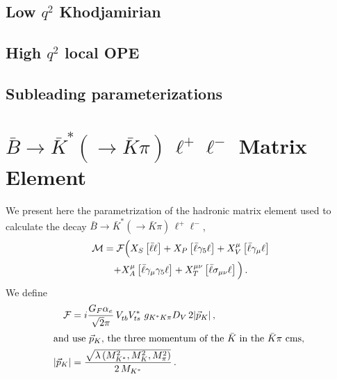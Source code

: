 %
\subsection{\boldmath Low $q^2$ Khodjamirian \label{sec:trAmps:QCDF}}

%
\subsection{\boldmath High $q^2$ local OPE \label{sec:trAmps:QCDF}}

%
\subsection{\boldmath Subleading parameterizations \label{sec:trAmps:QCDF}}

%
%
\section{$\bar{B}\to\bar{K}^*(\to \bar{K}\pi)\,\ell^+\ell^-$ Matrix Element 
  \label{sec:calculation}}

We present here the parametrization of the hadronic matrix element used to
calculate the decay $\bar{B}\to\bar{K}^*(\to \bar{K}\pi)\,\ell^+\ell^-$,
\begin{multline}
  \label{eq:BKpill:ME:X}
  {\cal M} =
  {\cal F} \Big( X_S \left\lbrack\bar{\ell} \ell\right\rbrack
    + X_P \left\lbrack\bar{\ell} \gamma_5 \ell\right\rbrack
    + X^{\mu}_V \left\lbrack\bar{\ell} \gamma_{\mu} \ell\right\rbrack\\
    + X^{\mu}_A \left\lbrack\bar{\ell} \gamma_{\mu} \gamma_5 \ell\right\rbrack
    + X^{\mu\nu}_T \left\lbrack\bar{\ell} \sigma_{\mu\nu} \ell\right\rbrack
    \Big)\,.
\end{multline}
We define
\begin{align}
  {\cal F} & = i \frac{G_{F} \alpha_e}{\sqrt{2} \pi}\, V_{tb}^{} V_{ts}^{\ast}\,\,
               g_{K^*K\pi} D_V\, 2 |\vec{p}_K|\,,\\
\intertext{and use $\vec{p}_K$, the three momentum of the $\bar{K}$ in the $\bar{K}\pi$ cms,
}
  |\vec{p}_K| & = \frac{\sqrt{\lambda\left(M^2_{K^*}, M^2_K, M^2_\pi\right)}}{2\, M_{K^*}}\,.
\end{align}

